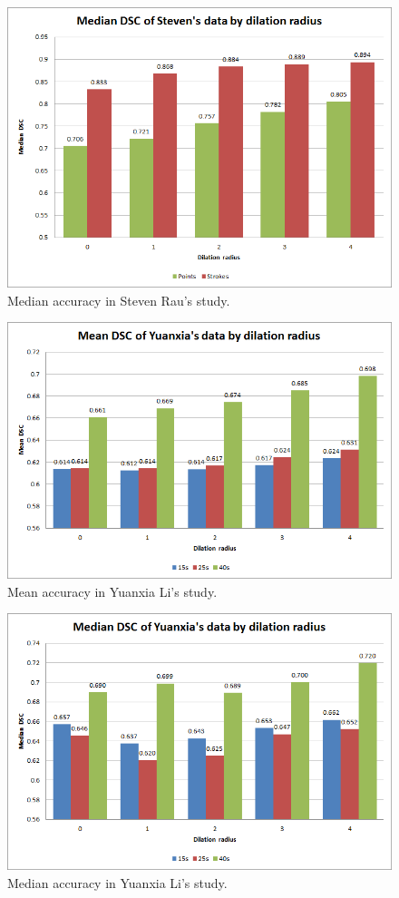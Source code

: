 \documentclass[12pt,a4paper,notitlepage]{article}
\begin{document}
\begin{figure}[H]
	\includegraphics[width=.9\linewidth]{steven_median_dsc}
	\caption{Median accuracy in Steven Rau's study.}
	\label{fig:steven_median_dsc}
\end{figure}

\begin{figure}[H]
	\includegraphics[width=.9\linewidth]{yuanxia_mean_dsc}
	\caption{Mean accuracy in Yuanxia Li's study.}
	\label{fig:yuanxia_mean_dsc}
\end{figure}

\begin{figure}[H]
	\includegraphics[width=.9\linewidth]{yuanxia_median_dsc}
	\caption{Median accuracy in Yuanxia Li's study.}
	\label{fig:yuanxia_median_dsc}
\end{figure}
\end{document}
